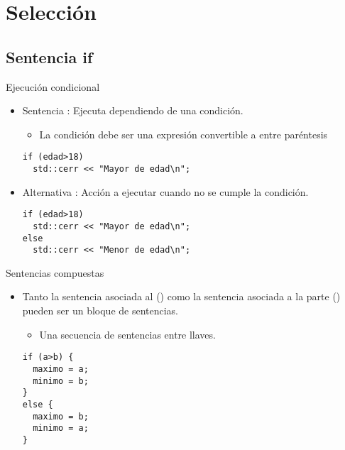 \section{Selección}

\subsection{Sentencia \textbf{if}}

\begin{frame}[t,fragile]{Ejecución condicional}
\begin{itemize}
  \item Sentencia : Ejecuta dependiendo de una condición.
    \begin{itemize}
      \item La condición debe ser una expresión convertible a
             entre paréntesis
    \end{itemize}
\begin{lstlisting}
if (edad>18) 
  std::cerr << "Mayor de edad\n";
\end{lstlisting}

  \item Alternativa : Acción a ejecutar cuando no se cumple 
        la condición.
\begin{lstlisting}
if (edad>18) 
  std::cerr << "Mayor de edad\n";
else
  std::cerr << "Menor de edad\n";
\end{lstlisting}
\end{itemize}
\end{frame}

\begin{frame}[t,fragile]{Sentencias compuestas}
\begin{itemize}
  \item Tanto la sentencia asociada al  ()
        como la sentencia asociada a la parte  ()
        pueden ser un bloque de sentencias.
    \begin{itemize}
      \item Una secuencia de sentencias entre llaves.
    \end{itemize}
\begin{lstlisting}
if (a>b) {
  maximo = a;
  minimo = b;
}
else {
  maximo = b;
  minimo = a;
}
\end{lstlisting}
\end{itemize}
\end{frame}

